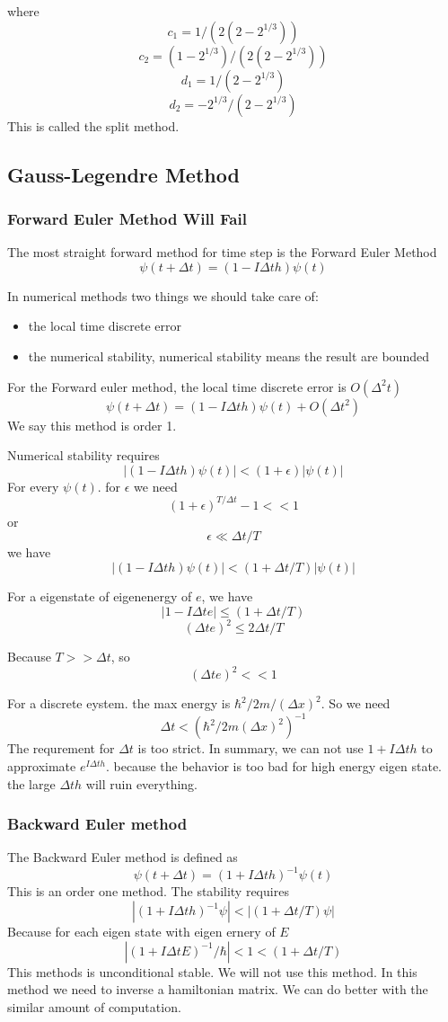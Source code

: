 \documentclass[12pt,twoside]{article}
\begin{document}
where
$$
c_1 = 1/(2(2-2^{1/3}))
$$
$$
c_2 = (1-2^{1/3})/(2(2-2^{1/3}))
$$
$$
d_1 = 1/(2-2^{1/3})
$$
$$
d_2 = -2^{1/3}/(2-2^{1/3})
$$
This is called the split method.
\subsection{Gauss-Legendre Method}

\subsubsection{Forward Euler Method Will Fail}
The most straight forward method for time step is the Forward Euler Method
$$
\psi(t + \Delta t) = (1 - I \Delta t h) \psi(t)
$$

In numerical methods two things we should take care of:
\begin{itemize}
\item the local time discrete error
\item the numerical stability, numerical stability means the result are bounded
\end{itemize}
For the Forward euler method, the local time discrete error is $O(\Delta ^2 t)$
$$
\psi(t + \Delta t) = (1 - I \Delta t h)\psi(t) + O(\Delta t^2)
$$
We say this method is order 1.

Numerical stability requires
$$
|(1 - I \Delta t h)\psi(t)| < (1 + \epsilon)|\psi(t)|
$$
For every $\psi(t)$. for $\epsilon$ we need
$$
(1 + \epsilon)^{T/\Delta t} - 1 << 1
$$
or
$$
\epsilon \ll \Delta t / T
$$
we have
$$
|(1 - I \Delta t h)\psi(t)| < (1 + \Delta t / T)|\psi(t)|
$$

 For a eigenstate of eigenenergy of $e$, we have
$$
| 1 - I \Delta t e| \le (1 + \Delta t / T)
$$
$$
(\Delta t e)^2 \le 2 \Delta t / T
$$

Because $T >> \Delta t$, so
$$
(\Delta t e)^2 << 1
$$

For a discrete eystem. the max energy is $\hbar^2/2m/(\Delta x)^2$. So we need
$$
\Delta t < (\hbar^2/2m(\Delta x)^2)^{-1}
$$
The requrement for $\Delta t$ is too strict.
In summary, we can not use $1 + I\Delta t h$ to approximate $e^{I\Delta t h}$. because the behavior is too bad for high energy eigen state. the large $\Delta t h$ will ruin everything.

\subsubsection{Backward Euler method}
The Backward Euler method is defined as
$$
\psi(t + \Delta t) = (1 + I \Delta t h)^{-1} \psi(t)
$$
This is an order one method.
The stability requires
$$
|(1 + I \Delta t h)^{-1}\psi| < |(1 + \Delta t / T) \psi|
$$
Because for each eigen state with eigen ernery of $E$
$$
|(1 + I \Delta t E)^{-1}/\hbar| < 1 < (1 + \Delta t / T)
$$
This methods is unconditional stable. We will not use this method. In this method we need to inverse a hamiltonian matrix.
We can do better with the similar amount of computation.
\end{document}

